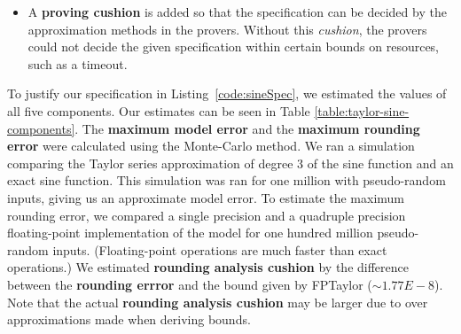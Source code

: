 \documentclass[runningheads]{llncs}
\begin{document}
\begin{itemize}
\begin{itemize}
  \end{itemize} 
  \item A \textbf{proving cushion} is added so that the specification can be decided by the approximation methods in the provers.
  Without this \emph{cushion}, the provers could not decide the given specification within certain bounds on resources, such as a timeout.
\end{itemize}

To justify our specification in Listing~\ref{code:sineSpec}, we estimated the values of all five components. 
Our estimates can be seen in Table \ref{table:taylor-sine-components}.
The \textbf{maximum model error} and the \textbf{maximum rounding error} were calculated using the Monte-Carlo method.
We ran a simulation comparing the Taylor series approximation of degree 3 of the sine function and an exact sine function.
This simulation was ran for one million with pseudo-random inputs, giving us an approximate model error.
To estimate the maximum rounding error,
we compared a single precision and a quadruple precision floating-point implementation of the model for one hundred million pseudo-random inputs.
(Floating-point operations are much faster than exact operations.)
We estimated \textbf{rounding analysis cushion} by the difference between the \textbf{rounding errror} and the bound given by FPTaylor ($\sim 1.77E{-}8$).
Note that the actual \textbf{rounding analysis cushion} may be larger due to over approximations made when deriving bounds.
\end{document}
